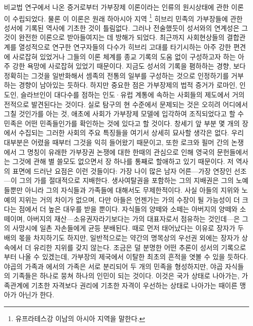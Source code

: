 비교법 연구에서 나온 증거로부터
가부장제 이론이라는
인류의 원시상태에 관한 이론이 수립되었다.
물론 이 이론은 원래 하아시아 지역%
\footnote{유프라테스강 이남의 아시아 지역을 말한다.}
히브리 민족의 가부장들에 관한 성서에 기록된 역사에 기초한 것이 틀림없다.
그러나 전술했듯이 성서와의 연계성은 그것이 완전한 이론으로
받아들여지는 데 방해가 되었다.
최근까지 사회현상들의 결합관계를 열성적으로 연구한 연구자들의 다수가
히브리 고대를 타기시하는 아주 강한 편견에 사로잡혀 있었거나
그들의 이론 체계를
종교 기록의 도움 없이
구성하고자 하는
아주 강한 욕망에 사로잡혀 있었기 때문이다.
지금도 성서의 기록을 폄하하는 경향,
보다 정확히는 그것을 일반화해서
셈족의 전통의 일부를 구성하는 것으로 인정하기를 거부하는
경향이 남아있는 듯하다.
하지만 중요한 점은 가부장제의 법적 증거가
로마인, 인도인, 슬라브인이 대다수를 점하는
인도^^b7유럽 계통에 속하는 사회들의 제도에서 거의 전적으로 발견된다는 것이다.
실로 탐구의 현 수준에서 문제되는 것은 오히려 어디에서 그칠 것인가를 아는 것,
애초에 사회가 가부장제 모델에 입각하여 조직되었다고 할 수 
민족은 어떤 민족들인가를 확인하는 것에 있다고 할 것이다.
창세기 앞 부분 몇 개의 장에서 수집되는 그러한 사회의 주요 특징들을
여기서 상세히 묘사할 생각은 없다.
우리 대부분은 어렸을 때부터 그것을 익히 들어왔기 때문이고, 또한
로크와 필머 간의 논쟁에서 그 명칭이 유래한 가부장권 논쟁에 대한
한때의 관심으로 인해
영국의 문헌들에서는
그것에 관해
별 쓸모도 없으면서
장 하나를 통째로 할애하고 있기 때문이다.
저 역사의 표면에 드러난 요점은 이런 것들이다:
가장 나이 많은 남자 어른---가장 연장인 선조---이 그의 가를
절대적으로 지배한다.
생사여탈권을 포함하는 그의 지배권은 그의 노예들뿐만 아니라
그의 자식들과 가족들에 대해서도 무제한적이다.
사실 아들의 지위와 노예의 지위는 거의 차이가 없으며,
다만 아들은 언젠가는 가의 수장이 될 가능성이 더 크다는 점에서 더 높은 대우를
받을 뿐이다.
자식들의 양떼와 소떼는 아버지의 양떼와 소떼이며,
아버지의 재산---소유권자라기보다는 가의 대표자로서 점유하는 것인데---은
그의 사망시에 일촌 자손들에게 균등 분배된다.
때로 먼저 태어났다는 이유로 장자가 두 배의 몫을 차지하기도 하지만,
일반적으로는 약간의 명목상의 우선권 외에는 장자가 상속에서 더 유리한
지위를 갖지 않는다.
조금은 덜 분명한 어떤 추론이 성서의 기록으로부터 나올 수 있겠는데,
가부장의 제국에서 이탈한 최초의 흔적을 엿볼 수 있을 듯하다.
야곱의 가족과 에서의 가족은 서로 분리되어 두 개의 민족을 형성하지만,
야곱 자식들의 기족들은 하나로 뭉쳐 하나의 인민이 되는 것이다.
이것은 국가 상태로 나아가는,
가족관계에 기초한 자격보다 권리에 기초한 자격이 우선하는 상태로 나아가는
때이른 맹아가 아닌가 한다.

